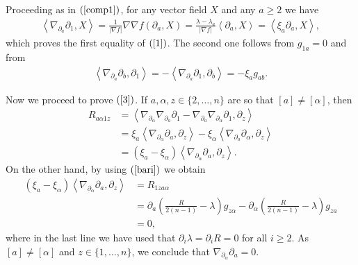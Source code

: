 \begin{demm}
	Proceeding as in $(\ref{comp1})$, for any vector field $X$ and any $a\geq2$ we have
	\begin{align*}
		\left\langle\nabla_{\partial_a}\partial_{1},X\right\rangle=\frac{1}{|\nabla f|}\nabla\nabla f(\partial_a,X)=\frac{\lambda-\lambda_{a}}{|\nabla f|}\left\langle\partial_{a},X\right\rangle=\left\langle\xi_{a}\partial_{a},X\right\rangle,
	\end{align*}
	which proves the first equality of $(\ref{1})$. The second one follows from $g_{1a}=0$ and from
	\begin{align*}
		\left\langle\nabla_{\partial_a}\partial_{b},\partial_{1}\right\rangle=-\left\langle\nabla_{\partial_a}\partial_{1},\partial_{b}\right\rangle=-\xi_{a}g_{ab}.
	\end{align*}

	Now we proceed to prove $(\ref{3})$. If $a,\alpha,z\in\{2,\ldots,n\}$ are so that $[a]\neq[\alpha]$, then
	\begin{align*}
		R_{a\alpha1z}&=\left\langle\nabla_{\partial_{\alpha}}\nabla_{\partial_{a}}\partial_{1}-\nabla_{\partial_{a}}\nabla_{\partial_{\alpha}}\partial_{1},\partial_{z}\right\rangle\\
		&=\xi_{a}\left\langle\nabla_{\partial_{\alpha}}\partial_{a},\partial_{z}\right\rangle-\xi_{\alpha}\left\langle\nabla_{\partial_{a}}\partial_{\alpha},\partial_{z}\right\rangle\\
		&=(\xi_{a}-\xi_{\alpha})\left\langle\nabla_{\partial_{\alpha}}\partial_{a},\partial_{z}\right\rangle.
	\end{align*}
	On the other hand, by using $(\ref{bari})$ we obtain
	\begin{align*}
		(\xi_{a}-\xi_{\alpha})\left\langle\nabla_{\partial_{\alpha}}\partial_{a},\partial_{z}\right\rangle&=R_{1za\alpha}\\
		&=\partial_{a}\left(\frac{R}{2(n-1)}-\lambda\right)g_{z\alpha}-\partial_{\alpha}\left(\frac{R}{2(n-1)}-\lambda\right)g_{za}\\
		&=0,
	\end{align*}
	where in the last line we have used that $\partial_{i}\lambda=\partial_{i}R=0$ for all $i\geq2$. As $[a]\neq[\alpha]$ and $z\in\{1,\ldots,n\}$, we conclude that $\nabla_{\partial_{\alpha}}\partial_{a}=0$.
	

\end{demm}
